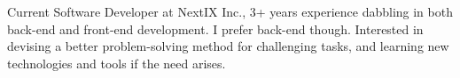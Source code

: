

\begin{cvparagraph}

Current Software Developer at NextIX Inc., 3+ years experience dabbling in both back-end and front-end development. I prefer back-end though. Interested in devising a better problem-solving method for challenging tasks, and learning new technologies and tools if the need arises.
\end{cvparagraph}
